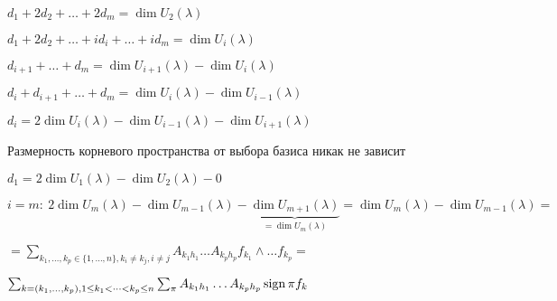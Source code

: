     \par $d_1 + 2d_2 + \dots + 2d_m = \dim U_2(\lambda)$
    \par $d_1 + 2d_2 + \dots + id_i + \dots + id_m = \dim U_i(\lambda)$
    \par $d_{i+1} + \dots + d_m = \dim U_{i+1}(\lambda) - \dim U_i(\lambda)$
    \par $d_i + d_{i+1} + \dots + d_m = \dim U_i(\lambda) - \dim U_{i-1}(\lambda)$
    \par $d_i = 2 \dim U_i(\lambda) - \dim U_{i-1}(\lambda) - \dim U_{i+1}(\lambda)$
    \par Размерность корневого пространства от выбора базиса никак не зависит
    \par $d_1 = 2 \dim U_1(\lambda) - \dim U_2(\lambda) - 0$
    \par $i = m : \ 2 \dim U_m(\lambda) - \dim U_{m-1}(\lambda) - \underbrace{\dim U_{m+1}(\lambda)}_{= \dim U_m(\lambda)} = \dim U_m(\lambda) - \dim U_{m-1}(\lambda) =$
    \par $= \sum_{k_1, \dots, k_p \in \{1, \dots, n\}, k_i \not= k_j, i\not= j} A_{k_1h_1} \dots A_{k_ph_p} f_{k_1} \wedge \dots f_{k_p} = $
    \par $\sum_{k = (k_1, \dots, k_p), 1 \le k_1 < \dots < k_p \le n} \sum_{\pi} A_{k_1h_1} \dots A_{k_ph_p} \operatorname{sign} \pi f_k$



